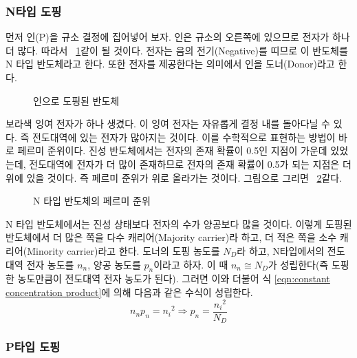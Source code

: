 \subsubsection{N타입 도핑}
먼저 인(P)을 규소 결정에 집어넣어 보자. 인은 규소의 오른쪽에 있으므로 전자가 하나 더 많다. 따라서 \figurename~\ref{fig:P doping}\과 같이 될 것이다.
전자는 음의 전기(Negative)를 띠므로 이 반도체를 N 타입 반도체라고 한다. 또한 전자를 제공한다는 의미에서 인을 도너(Donor)라고 한다.
\begin{figure}[!hbp]
    \centering
    \caption{인으로 도핑된 반도체}\label{fig:P doping}
\end{figure}
보라색 잉여 전자가 하나 생겼다. 이 잉여 전자는 자유롭게 결정 내를 돌아다닐 수 있다. 즉 전도대역에 있는 전자가 많아지는 것이다.
이를 수학적으로 표현하는 방법이 바로 페르미 준위이다. 진성 반도체에서는 전자의 존재 확률이 0.5인 지점이 가운데 있었는데, 전도대역에 전자가 더 많이 존재하므로 전자의 존재 확률이 0.5가 되는 지점은 더 위에 있을 것이다.
즉 페르미 준위가 위로 올라가는 것이다.
그림으로 그리면 \figurename~\ref{fig:n type fermi level}\과 같다.
\begin{figure}[!hbp]
    \centering
    \caption{N 타입 반도체의 페르미 준위}\label{fig:n type fermi level}
\end{figure}
N 타입 반도체에서는 진성 상태보다 전자의 수가 양공보다 많을 것이다. 이렇게 도핑된 반도체에서 더 많은 쪽을 다수 캐리어(Majority carrier)라 하고, 더 적은 쪽을 소수 캐리어(Minority carrier)라고 한다.
도너의 도핑 농도를 $N_D$라 하고, N타입에서의 전도대역 전자 농도를 $n_n$, 양공 농도를 $p_n$이라고 하자. 이 때 $n_n\cong N_D$가 성립한다(즉 도핑한 농도만큼이 전도대역 전자 농도가 된다). 그러면 이와 더불어 식 \ref{eqn:constant concentration product}에 의해 다음과 같은 수식이 성립한다.
\begin{equation}
    n_n p_n={n_i}^2 \Rightarrow p_n=\frac{{n_i}^2}{N_D}
\end{equation}

\subsubsection{P타입 도핑}